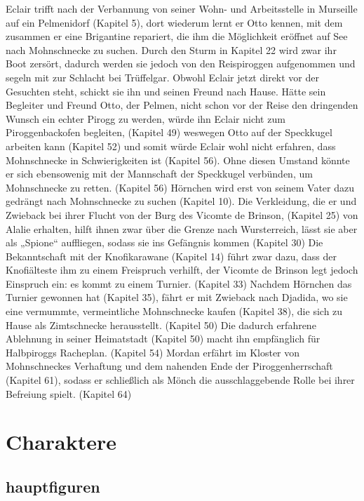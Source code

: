 Eclair trifft nach der Verbannung von seiner Wohn- und Arbeitsstelle in Murseille auf ein Pelmenidorf (Kapitel 5), dort wiederum lernt er Otto kennen, mit dem zusammen er eine Brigantine repariert, die ihm die Möglichkeit eröffnet auf See nach Mohnschnecke zu suchen. Durch den Sturm in Kapitel 22 wird zwar ihr Boot zersört, dadurch werden sie jedoch von den Reispiroggen aufgenommen und segeln mit zur Schlacht bei Trüffelgar. Obwohl Eclair jetzt direkt vor der Gesuchten steht, schickt sie ihn und seinen Freund nach Hause. Hätte sein Begleiter und Freund Otto, der Pelmen, nicht schon vor der Reise den dringenden Wunsch ein echter Pirogg zu werden, würde ihn Eclair nicht zum Piroggenbackofen begleiten, (Kapitel 49) weswegen Otto auf der Speckkugel arbeiten kann (Kapitel 52) und somit würde Eclair wohl nicht erfahren, dass Mohnschnecke in Schwierigkeiten ist (Kapitel 56). Ohne diesen Umstand könnte er sich ebensowenig mit der Mannschaft der Speckkugel verbünden, um Mohnschnecke zu retten. (Kapitel 56) Hörnchen wird erst von seinem Vater dazu gedrängt nach Mohnschnecke zu suchen (Kapitel 10). Die Verkleidung, die er und Zwieback bei ihrer Flucht von der Burg des Vicomte de Brinson, (Kapitel 25) von Alalie erhalten, hilft ihnen zwar über die Grenze nach Wursterreich, lässt sie aber als „Spione“ auffliegen, sodass sie ins Gefängnis kommen (Kapitel 30) Die Bekanntschaft mit der Knofikarawane (Kapitel 14) führt zwar dazu, dass der Knofiälteste ihm zu einem Freispruch verhilft, der Vicomte de Brinson legt jedoch Einspruch ein: es kommt zu einem Turnier. (Kapitel 33) Nachdem Hörnchen das Turnier gewonnen hat (Kapitel 35), fährt er mit Zwieback nach Djadida, wo sie eine vermummte, vermeintliche Mohnschnecke kaufen (Kapitel 38), die sich zu Hause als Zimtschnecke herausstellt. (Kapitel 50) Die dadurch erfahrene Ablehnung in seiner Heimatstadt (Kapitel 50) macht ihn empfänglich für Halbpiroggs Racheplan. (Kapitel 54) Mordan erfährt im Kloster von Mohnschneckes Verhaftung und dem nahenden Ende der Piroggenherrschaft (Kapitel 61), sodass er schließlich als Mönch die ausschlaggebende Rolle bei ihrer Befreiung spielt. (Kapitel 64)


\section{Charaktere}
\subsection{hauptfiguren}

